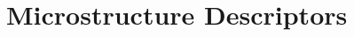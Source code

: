 % 
%





\renewcommand{\chabbr}{MICROD}


\chapter{Microstructure Descriptors}\label{\chabbr:ch:MicrostructureDescriptors} %

